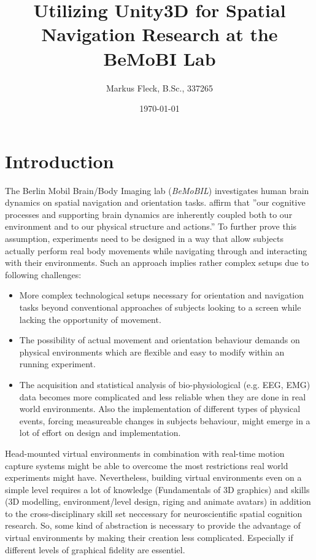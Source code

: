 \documentclass[bibtex,apacite]{apa6}
\title{Utilizing Unity3D for Spatial Navigation Research at the BeMoBI Lab}
\author{Markus Fleck, B.Sc., 337265}
\affiliation{Technical University Berlin, Department of Psychology and Ergonomics}
\date{\today}
\newcommand{\cItemSpacing}{0.05em}
\begin{document}
 
\maketitle

\section*{Introduction}
The Berlin Mobil Brain/Body Imaging lab (\emph{BeMoBIL}) investigates human brain dynamics on spatial navigation and orientation tasks.  affirm that ''our cognitive processes and supporting brain dynamics are inherently coupled both to our environment and to our physical structure and actions.'' To further prove this assumption, experiments need to be designed in a way that allow subjects actually perform real body movements while navigating through and interacting with their environments. Such an approach implies rather complex setups due to following challenges:
\begin{itemize} 
\setlength\itemsep{\cItemSpacing}
	\item More complex technological setups necessary for orientation and navigation tasks beyond conventional approaches of subjects looking to a screen while lacking the opportunity of movement. 
	\item The possibility of actual movement and orientation behaviour demands on physical environments which are flexible and easy to modify within an running experiment. 
	\item The acquisition and statistical analysis of bio-physiological (e.g. EEG, EMG) data becomes more complicated and less reliable when they are done in real world environments. Also the implementation of different types of physical events, forcing measureable changes in subjects behaviour, might emerge in a lot of effort on design and implementation. 
\end{itemize}
Head-mounted virtual environments in combination with real-time motion capture systems might be able to overcome the most restrictions real world experiments might have\cite{bohil2011virtual}. 
Nevertheless, building virtual environments even on a simple level requires a lot of knowledge (Fundamentals of 3D graphics) and skills (3D modelling, environment/level design, riging and animate avatars) in addition to the cross-disciplinary skill set neccessary for neuroscientific spatial cognition research. So, some kind of abstraction is necessary to provide the advantage of virtual environments by making their creation less complicated. Especially if different levels of graphical fidelity are essentiel. 
\end{document}
